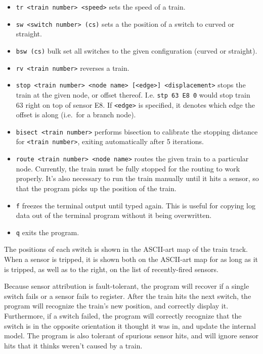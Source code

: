 \begin{itemize}
\itemsep1pt\parskip0pt
\item
  \texttt{tr \textless{}train number\textgreater{} \textless{}speed\textgreater{}}
  sets the speed of a train.
\item
  \texttt{sw \textless{}switch number\textgreater{} (c\textbar{}s)} sets
  a the position of a switch to curved or straight.
\item
  \texttt{bsw (c\textbar{}s)} bulk set all switches to the given
  configuration (curved or straight).
\item
  \texttt{rv \textless{}train number\textgreater{}} reverses a train.
\item
  \texttt{stop \textless{}train number\textgreater{} \textless{}node name\textgreater{} {[}\textless{}edge\textgreater{}{]} \textless{}displacement\textgreater{}}
  stops the train at the given node, or offset thereof. I.e.
  \texttt{stp 63 E8 0} would stop train 63 right on top of sensor E8. If
  \texttt{\textless{}edge\textgreater{}} is specified, it denotes which
  edge the offset is along (i.e.~for a branch node).
\item
  \texttt{bisect \textless{}train number\textgreater{}} performs
  bisection to calibrate the stopping distance for
  \texttt{\textless{}train number\textgreater{}}, exiting automatically
  after 5 iterations.
\item
  \texttt{route \textless{}train number\textgreater{} \textless{}node name\textgreater{}}
  routes the given train to a particular node. Currently, the train must
  be fully stopped for the routing to work properly. It's also necessary
  to run the train manually until it hits a sensor, so that the program
  picks up the position of the train.
\item
  \texttt{f} freezes the terminal output until typed again. This is
  useful for copying log data out of the terminal program without it
  being overwritten.
\item
  \texttt{q} exits the program.
\end{itemize}

The positions of each switch is shown in the ASCII-art map of the train
track. When a sensor is tripped, it is shown both on the ASCII-art map
for as long as it is tripped, as well as to the right, on the list of
recently-fired sensors.

Because sensor attribution is fault-tolerant, the program will recover
if a single switch fails or a sensor fails to register. After the train
hits the next switch, the program will recognize the train's new
position, and correctly display it. Furthermore, if a switch failed, the
program will correctly recognize that the switch is in the opposite
orientation it thought it was in, and update the internal model. The
program is also tolerant of spurious sensor hits, and will ignore sensor
hits that it thinks weren't caused by a train.
